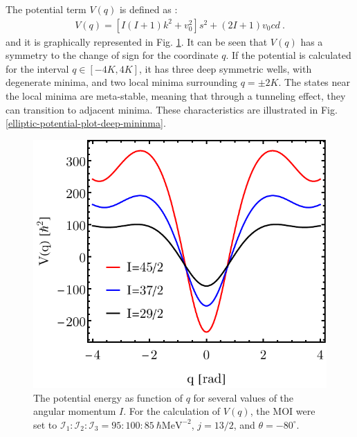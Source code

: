 The potential term $V(q)$ is defined as \cite{raduta2020new}:
\begin{align}
    V(q)=\left[I(I+1)k^2+v_0^2\right]s^2+\left(2I+1\right)v_0cd\ .
    \label{elliptic-potential-formula}
\end{align}
and it is graphically represented in Fig. \ref{elliptic-potential-plot}. It can be seen that $V(q)$ has a symmetry to the change of sign for the coordinate $q$. If the potential is calculated for the interval $q\in\left[-4K,4K\right]$, it has three deep symmetric wells, with degenerate minima, and two local minima surrounding $q=\pm 2K$. The states near the local minima are meta-stable, meaning that through a tunneling effect, they can transition to adjacent minima. These characteristics are illustrated in Fig. \ref{elliptic-potential-plot-deep-mininma}.
\begin{figure}
    \centering
    \includegraphics[scale=0.8]{Chapters/Figures/Elliptic-Potential-V.pdf}
    \caption{The potential energy as function of $q$ for several values of the angular momentum $I$. For the calculation of $V(q)$, the MOI were set to $\mathcal{I}_1:\mathcal{I}_2:\mathcal{I}_3=95:100:85\ \hbar\text{MeV}^{-2}$, $j=13/2$, and $\theta=-80^\circ$.}
    \label{elliptic-potential-plot}
\end{figure}
